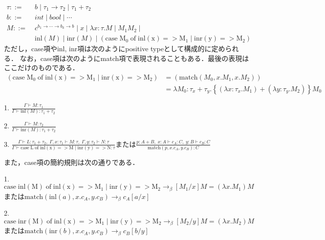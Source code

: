\documentclass[uplatex, 12pt, dvipdfmx]{jsreport}
\begin{document}
\begin{definition}
    \begin{align*}
        \tau ::=&\; b\mid \tau_1\to\tau_2 \mid \tau_1+\tau_2 \\
        b ::=&\; int\mid bool\mid\cdots \\
        M ::=&\; c^{b_1\to\cdots\to b_k\to b}\mid x\mid \lambda x:\tau.M\mid M_1M_2 \mid\\
        &\; \mathrm{inl}(M)\mid\mathrm{inr}(M)\mid \left( \mathrm{case\;M_0\;of\;inl(x)=>M_1\mid inr(y)=>M_2} \right)
    \end{align*}
    ただし，case項やinl, inr項は次のようにpositive typeとして構成的に定められる．
    なお，case項は次のようにmatch項で表現されることもある．最後の表現はここだけのものである．
    \begin{align*}
        \left( \mathrm{case\;M_0\;of\;inl(x)=>M_1\mid inr(x)=>M_2} \right) &= \left( \mathrm{match}(M_0,x.M_1,x.M_2) \right)\\
        &= \lambda M_0:\tau_x+\tau_y.\left\{ (\lambda x:\tau_x.M_1)+(\lambda y:\tau_y.M_2) \right\}M_0
    \end{align*}

    1. $\frac{\Gamma\vdash M:\tau_1}{\Gamma\vdash\mathrm{inl}(M):\tau_1+\tau_2}$

    2. $\frac{\Gamma\vdash M:\tau_2}{\Gamma\vdash\mathrm{inr}(M):\tau_1+\tau_2}$

    3. $\frac{\Gamma\vdash L:\tau_1+\tau_2, \;\Gamma,x:\tau_1\vdash M:\tau, \;\Gamma,y:\tau_2\vdash N:\tau}{\Gamma\vdash \mathrm{case\;L\;of\;inl(x)=>M\mid inr(y)=>N}:\tau }$または$\frac{p:A+B,\;x:A\vdash c_A:C,\;y:B\vdash c_B:C}{\mathrm{match}(p,x.c_A,y.c_B):C}$

    また，case項の簡約規則は次の通りである．

    1. $\mathrm{case\;inl(M)\;of\;inl(x)=>M_1\mid inr(y)=>M_2} \to_\beta [M_1/x]M=(\lambda x.M_1)M$または$\mathrm{match}(\mathrm{inl}(a),x.c_A,y.c_B)\to_\beta c_A[a/x]$

    2. $\mathrm{case\;inr(M)\;of\;inl(x)=>M_1\mid inr(y)=>M_2} \to_\beta [M_2/y]M=(\lambda x.M_2)M$または$\mathrm{match}(\mathrm{inr}(b),x.c_A,y.c_B)\to_\beta c_B[b/y]$
\end{definition}
\end{document}
